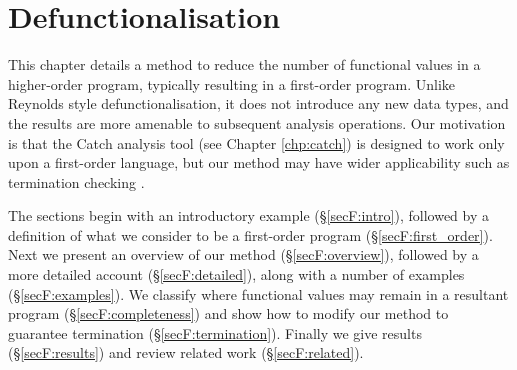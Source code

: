 


\newenvironment{definition}
    {\smallskip
     \noindent\textbf{Definition:}}
    {\noexample}

\begin{comment}
\begin{code}
import Prelude hiding (map)
import Data.List hiding (map)

data Expr = EVar String
          | ECon String [Expr]
          | EFun String [Expr]
          | EApp Expr [Expr]
          | ELam String Expr
          | ELet String Expr Expr
          | ECase Expr [Alt]
data Alt = EAlt String [String] Expr

instance Eq Expr

type FuncName = String
body   :: FuncName  -> Expr
rhs    :: Alt       -> Expr

data World = World
expensive :: a -> b
primEqInt, primNeqInt :: Int -> Int -> Bool
primCatch :: alpha -> (IOError -> alpha) -> alpha
\end{code}
\end{comment}



\chapter{Defunctionalisation}
\label{chp:firstify}

This chapter details a method to reduce the number of functional values in a higher-order program, typically resulting in a first-order program. Unlike Reynolds style defunctionalisation, it does not introduce any new data types, and the results are more amenable to subsequent analysis operations. Our motivation is that the Catch analysis tool (see Chapter \ref{chp:catch}) is designed to work only upon a first-order language, but our method may have wider applicability such as termination checking \cite{sereni:higher_order_termination}.

The sections begin with an introductory example (\S\ref{secF:intro}), followed by a definition of what we consider to be a first-order program (\S\ref{secF:first_order}). Next we present an overview of our method (\S\ref{secF:overview}), followed by a more detailed account (\S\ref{secF:detailed}), along with a number of examples (\S\ref{secF:examples}). We classify where functional values may remain in a resultant program (\S\ref{secF:completeness}) and show how to modify our method to guarantee termination (\S\ref{secF:termination}). Finally we give results (\S\ref{secF:results}) and review related work (\S\ref{secF:related}).

